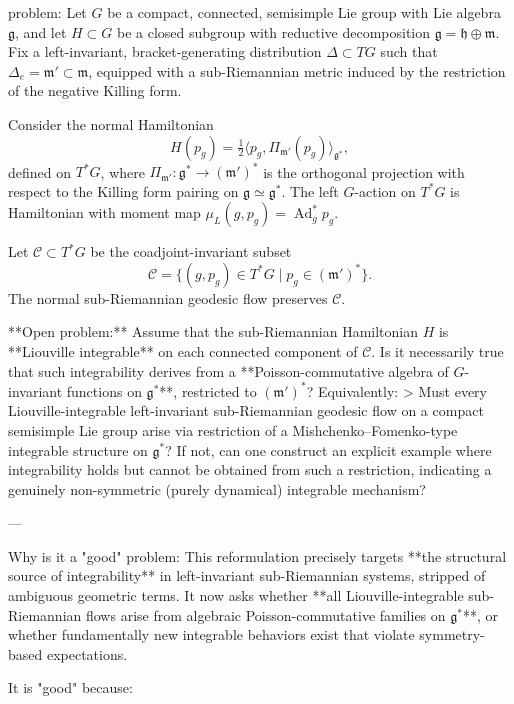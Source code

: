 problem:  
Let \( G \) be a compact, connected, semisimple Lie group with Lie algebra \( \mathfrak{g} \), and let \( H \subset G \) be a closed subgroup with reductive decomposition \( \mathfrak{g} = \mathfrak{h} \oplus \mathfrak{m} \).  
Fix a left-invariant, bracket-generating distribution \( \Delta \subset TG \) such that \( \Delta_e = \mathfrak{m}' \subset \mathfrak{m} \), equipped with a sub-Riemannian metric induced by the restriction of the negative Killing form.

Consider the normal Hamiltonian 
\[
H(p_g) = \tfrac{1}{2}\langle p_g , \Pi_{\mathfrak{m}'}(p_g)\rangle_{\mathfrak{g}^*},
\]
defined on \( T^*G \), where \( \Pi_{\mathfrak{m}'}: \mathfrak{g}^* \to (\mathfrak{m}')^* \) is the orthogonal projection with respect to the Killing form pairing on \( \mathfrak{g} \simeq \mathfrak{g}^* \).  
The left \(G\)-action on \(T^*G\) is Hamiltonian with moment map \( \mu_L(g,p_g)=\operatorname{Ad}_g^* p_g \).

Let \( \mathcal{C}\subset T^*G \) be the coadjoint-invariant subset
\[
\mathcal{C} = \{(g,p_g)\in T^*G \mid p_g \in (\mathfrak{m}')^* \}.
\]
The normal sub-Riemannian geodesic flow preserves \(\mathcal{C}\).

**Open problem:**  
Assume that the sub-Riemannian Hamiltonian \(H\) is **Liouville integrable** on each connected component of \(\mathcal{C}\). Is it necessarily true that such integrability derives from a **Poisson-commutative algebra of \(G\)-invariant functions on \(\mathfrak{g}^*\)**, restricted to \((\mathfrak{m}')^*\)?  
Equivalently:  
> Must every Liouville-integrable left-invariant sub-Riemannian geodesic flow on a compact semisimple Lie group arise via restriction of a Mishchenko–Fomenko-type integrable structure on \( \mathfrak{g}^* \)?  
If not, can one construct an explicit example where integrability holds but cannot be obtained from such a restriction, indicating a genuinely non-symmetric (purely dynamical) integrable mechanism?

---

Why is it a "good" problem:  
This reformulation precisely targets **the structural source of integrability** in left-invariant sub-Riemannian systems, stripped of ambiguous geometric terms. It now asks whether **all Liouville-integrable sub-Riemannian flows arise from algebraic Poisson-commutative families on \(\mathfrak{g}^*\)**, or whether fundamentally new integrable behaviors exist that violate symmetry-based expectations.

It is "good" because:

